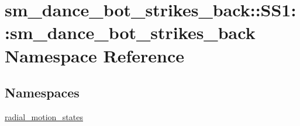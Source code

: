 \hypertarget{namespacesm__dance__bot__strikes__back_1_1SS1_1_1sm__dance__bot__strikes__back}{}\section{sm\+\_\+dance\+\_\+bot\+\_\+strikes\+\_\+back\+:\+:S\+S1\+:\+:sm\+\_\+dance\+\_\+bot\+\_\+strikes\+\_\+back Namespace Reference}
\label{namespacesm__dance__bot__strikes__back_1_1SS1_1_1sm__dance__bot__strikes__back}
\subsection*{Namespaces}
\begin{DoxyCompactItemize}
\item 
 \hyperlink{namespacesm__dance__bot__strikes__back_1_1SS1_1_1sm__dance__bot__strikes__back_1_1radial__motion__states}{radial\+\_\+motion\+\_\+states}
\end{DoxyCompactItemize}
